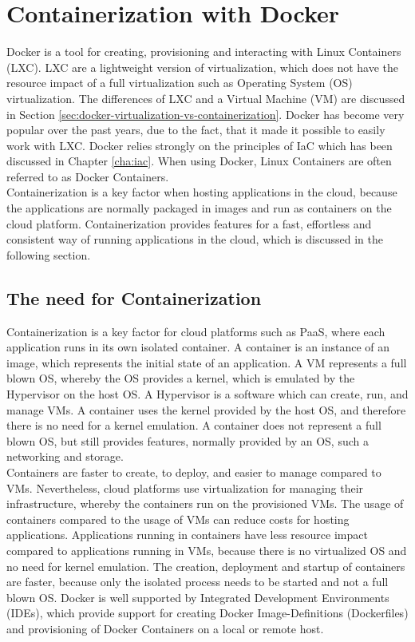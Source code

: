 \chapter{Containerization with Docker}
\label{cha:containerization-docker}
Docker is a tool for creating, provisioning and interacting with Linux Containers (LXC). LXC are a lightweight version of virtualization, which does not have the resource impact of a full virtualization such as Operating System (OS) virtualization. The differences of LXC and a Virtual Machine (VM) are discussed in Section \vref{sec:docker-virtualization-vs-containerization}. Docker has become very popular over the past years, due to the fact, that it made it possible to easily work with LXC. Docker relies strongly on the principles of IaC which has been discussed in Chapter \vref{cha:iac}. When using Docker, Linux Containers are often referred to as Docker Containers\cite{Docker2018,LXC2018}. \\

Containerization is a key factor when hosting applications in the cloud, because the applications are normally packaged in images and run as containers on the cloud platform. Containerization provides features for a fast, effortless and consistent way of running applications in the cloud, which is discussed in the following section.

\section{The need for Containerization}
\label{sec:docker-need-for-containerization}
Containerization is a key factor for cloud platforms such as PaaS, where each application runs in its own isolated container. A container is an instance of an image, which represents the initial state of an application. A VM represents a full blown OS, whereby the OS provides a kernel, which is emulated by the Hypervisor on the host OS. A Hypervisor is a software which can create, run, and manage VMs. A container uses the kernel provided by the host OS, and therefore there is no need for a kernel emulation. A container does not represent a full blown OS, but still provides features, normally provided by an OS, such a networking and storage\cite{DockerVirtScheepers2014}. \\ 

Containers are faster to create, to deploy, and easier to manage compared to VMs. Nevertheless, cloud platforms use virtualization for managing their infrastructure, whereby the containers run on the provisioned VMs. The usage of containers compared to the usage of VMs can reduce costs for hosting applications. Applications running in containers have less resource impact compared to applications running in VMs, because there is no virtualized OS and no need for kernel emulation. The creation, deployment and startup of containers are faster, because only the isolated process needs to be started and not a full blown OS. Docker is well supported by Integrated Development Environments (IDEs), which provide support for creating Docker Image-Definitions (Dockerfiles) and provisioning of Docker Containers on a local or remote host\cite{DockerFile2018}. \\

